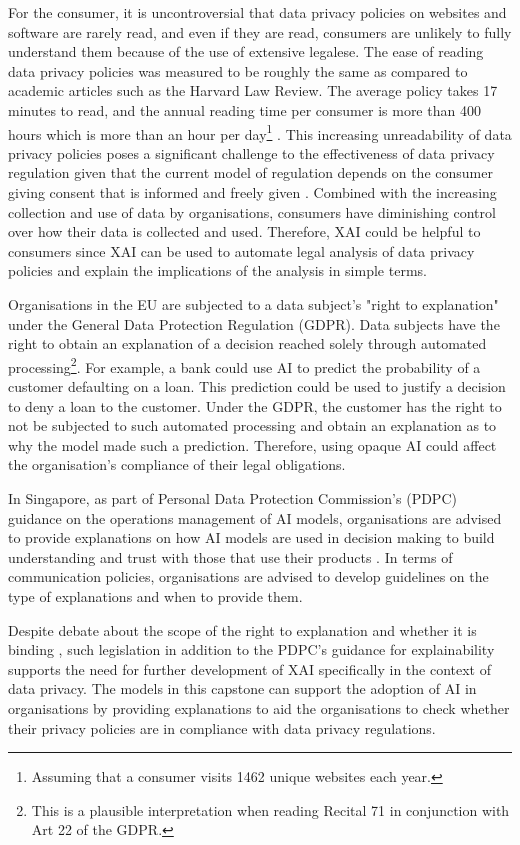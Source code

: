 For the consumer, it is uncontroversial that data privacy policies on websites and software are rarely read, and even if they are read, consumers are unlikely to fully understand them because of the use of extensive legalese. The ease of reading data privacy policies was measured to be roughly the same as compared to academic articles such as the Harvard Law Review. The average policy takes 17 minutes to read, and the annual reading time per consumer is more than 400 hours which is more than an hour per day\footnote{Assuming that a consumer visits 1462 unique websites each year.} \cite{wagner2022privacy}. This increasing unreadability of data privacy policies poses a significant challenge to the effectiveness of data privacy regulation given that the current model of regulation depends on the consumer giving consent that is informed and freely given \cite{mantelero_2014}. Combined with the increasing collection and use of data by organisations, consumers have diminishing control over how their data is collected and used. Therefore, XAI could be helpful to consumers since XAI can be used to automate legal analysis of data privacy policies and explain the implications of the analysis in simple terms.

Organisations in the EU are subjected to a data subject's "right to explanation" under the General Data Protection Regulation (GDPR). Data subjects have the right to obtain an explanation of a decision reached solely through automated processing\footnote{This is a plausible interpretation when reading Recital 71 in conjunction with Art 22 of the GDPR.}. For example, a bank could use AI to predict the probability of a customer defaulting on a loan. This prediction could be used to justify a decision to deny a loan to the customer. Under the GDPR, the customer has the right to not be subjected to such automated processing and obtain an explanation as to why the model made such a prediction. Therefore, using opaque AI could affect the organisation's compliance of their legal obligations.

In Singapore, as part of Personal Data Protection Commission's (PDPC) guidance on the operations management of AI models, organisations are advised to provide explanations on how AI models are used in decision making to build understanding and trust with those that use their products \cite{ai_modelframework}. In terms of communication policies, organisations are advised to develop guidelines on the type of explanations and when to provide them.

Despite debate about the scope of the right to explanation and whether it is binding \cite{chesterman2021_transparency}, such legislation in addition to the PDPC's guidance for explainability supports the need for further development of XAI specifically in the context of data privacy. The models in this capstone can support the adoption of AI in organisations by providing explanations to aid the organisations to check whether their privacy policies are in compliance with data privacy regulations.

